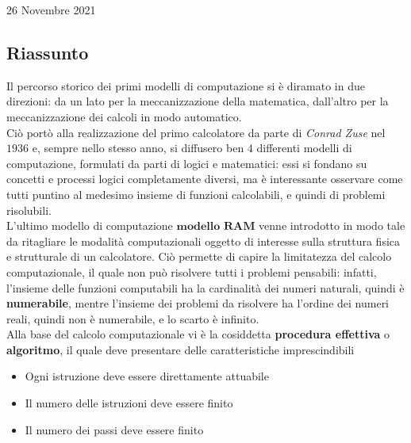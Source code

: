 \documentclass[a4paper]{extarticle}
\begin{document}
\newpage
\begin{center}
    26 Novembre 2021
\end{center}
\subsection{Riassunto}
Il percorso storico dei primi modelli di computazione si è diramato in due direzioni: da un lato per la meccanizzazione della matematica, dall'altro per la meccanizzazione dei calcoli in modo automatico.\\
Ciò portò alla realizzazione del primo calcolatore da parte di \textit{Conrad Zuse} nel \(1936\) e, sempre nello stesso anno, si diffusero ben \(4\) differenti modelli di computazione, formulati da parti di logici e matematici: essi si fondano su concetti e processi logici completamente diversi, ma è interessante osservare come tutti puntino al medesimo insieme di funzioni calcolabili, e quindi di problemi risolubili.\\
L'ultimo modello di computazione \(\textbf{modello RAM}\) venne introdotto in modo tale da ritagliare le modalità computazionali oggetto di interesse sulla struttura fisica e strutturale di un calcolatore. Ciò permette di capire la limitatezza del calcolo computazionale, il quale non può risolvere tutti i problemi pensabili: infatti, l'insieme delle funzioni computabili ha la cardinalità dei numeri naturali, quindi è \textbf{numerabile}, mentre l'insieme dei problemi da risolvere ha l'ordine dei numeri reali, quindi non è numerabile, e lo scarto è infinito.\\
Alla base del calcolo computazionale vi è la cosiddetta \textbf{procedura effettiva} o \textbf{algoritmo}, il quale deve presentare delle caratteristiche imprescindibili
\begin{itemize}
    \item Ogni istruzione deve essere direttamente attuabile
    \item Il numero delle istruzioni deve essere finito
    \item Il numero dei passi deve essere finito
\end{itemize}
\end{document}
